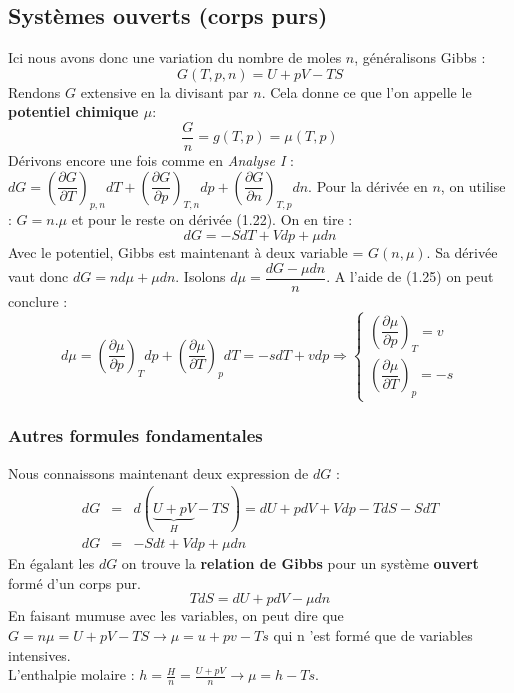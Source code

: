 \documentclass[11pt, a4paper, openany]{book}
\begin{document}
		\subsection{Systèmes ouverts (corps purs)}
		Ici nous avons donc une variation du nombre de moles $n$, généralisons Gibbs :
		\begin{equation}
			G(T,p,n) = U + pV - TS
		\end{equation}
		Rendons $G$ extensive en la divisant par $n$. Cela donne ce que l'on appelle le \textbf{potentiel chimique $\mu$}:
		\begin{equation}
			\frac{G}{n} = g(T, p) = \mu(T,p)
		\end{equation}
		Dérivons encore une fois comme en \textit{Analyse I} :\\
		$dG = \left(\dfrac{\partial G}{\partial T}\right)_{p,n} dT + \left(\dfrac{\partial G}{\partial p}\right)_{T,n} dp +  \left(\dfrac{\partial G}{\partial n}\right)_{T,p}dn$. Pour la dérivée en $n$, on utilise : $G = n.\mu$ et pour le reste on dérivée (1.22). On en tire :
		\begin{equation}
			dG = -SdT + Vdp + \mu dn
		\end{equation}
		Avec le potentiel, Gibbs est maintenant à deux variable = $G(n,\mu)$. Sa dérivée vaut donc $dG = nd\mu + \mu dn$. Isolons $d\mu = \dfrac{dG - \mu dn}{n}$. A l'aide de (1.25) on peut conclure :
		\begin{equation}
			d\mu =\left(\frac{\partial\mu}{\partial p}\right)_Tdp+\left(\frac{\partial\mu}{\partial T}\right)_pdT= -sdT + vdp\Rightarrow\left\{\begin{array}{l}
			\left(\dfrac{\partial \mu}{\partial p}\right)_T = v\\
			\left(\dfrac{\partial \mu}{\partial T}\right)_p = -s
			\end{array}\right.
		\end{equation}
		\subsubsection{Autres formules fondamentales}
		Nous connaissons maintenant deux expression de $dG$ :
		\begin{eqnarray}
			dG &=& d(\underbrace{U + pV}_H - TS) = dU + pdV + Vdp - TdS - SdT\\
			dG &=& -Sdt + Vdp + \mu dn
		\end{eqnarray}
		En égalant les $dG$ on trouve la \textbf{relation de Gibbs} pour un système \textbf{ouvert} formé d'un corps pur.
		\begin{equation}
			TdS = dU + pdV - \mu dn
		\end{equation}
		En faisant mumuse avec les variables, on peut dire que $G = n\mu = U + pV - TS \rightarrow \mu = u + pv - Ts$ qui n 'est formé que de variables intensives.\\
		L'enthalpie molaire : $h = \frac{H}{n} = \frac{U + pV}{n} \rightarrow \mu = h - Ts$.
		
\end{document}
